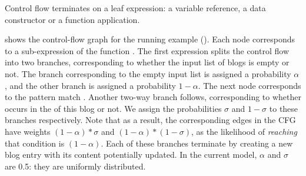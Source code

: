 %
%
Control flow terminates on a leaf \systemlang{} expression: a variable reference,
a data constructor or a function application.

%
%

%

 shows the control-flow graph for the running example ().
%
{Each node corresponds to a sub-expression of the function .
%
The first  expression splits the control flow into two branches,
corresponding to whether the input list of blogs is empty or not.
%
The branch corresponding to the empty input list is assigned a probability $\alpha$, and
the other branch is assigned a probability $1 - \alpha$.
%
The next node corresponds to the pattern match .
%
Another two-way branch follows, corresponding to whether  occurs in
the  of this blog or not.
%
We assign the probabilities $\sigma$ and $1-\sigma$ to these branches respectively.
%
Note that as a result, the corresponding edges in the CFG have weights $(1 - \alpha)*\sigma$ and $(1 - \alpha)*(1 - \sigma)$, as the likelihood of {\em reaching} that condition is $(1 - \alpha)$.
%
Each of these branches terminate by creating a new blog entry with its content potentially updated.
%
In the current model, $\alpha$ and $\sigma$ are 0.5: they are uniformly distributed.
}
%

